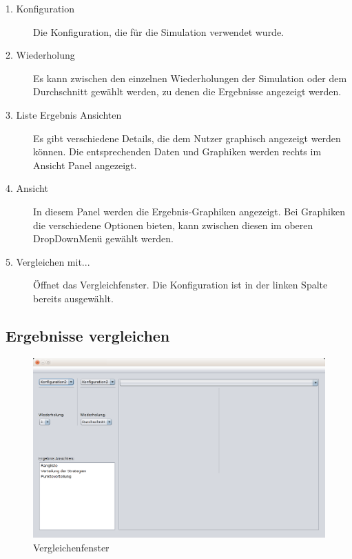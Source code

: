 \begin{description}

\item[1. Konfiguration] Die Konfiguration, die für die Simulation verwendet wurde.

\item[2. Wiederholung] Es kann zwischen den einzelnen Wiederholungen der Simulation oder dem Durchschnitt gewählt werden, zu denen die Ergebnisse angezeigt werden.

\item[3. Liste Ergebnis Ansichten] Es gibt verschiedene Details, die dem Nutzer graphisch angezeigt werden können. Die entsprechenden Daten und Graphiken werden rechts im Ansicht Panel angezeigt.

\item[4. Ansicht] In diesem Panel werden die Ergebnis-Graphiken angezeigt. Bei Graphiken die verschiedene Optionen bieten, kann zwischen diesen im oberen DropDownMenü gewählt werden.

\item[5. Vergleichen mit...] Öffnet das Vergleichfenster. Die Konfiguration ist in der linken Spalte bereits ausgewählt.

\end{description}

\pagebreak


\subsection{Ergebnisse vergleichen}

\begin{figure}[!hp] 
  \centering
     \includegraphics[width=1.15\textwidth]{GUI_Entwurf/Vergleichfenster.png}
  \caption{Vergleichenfenster}
  \label{fig:Bild1}
\end{figure}

